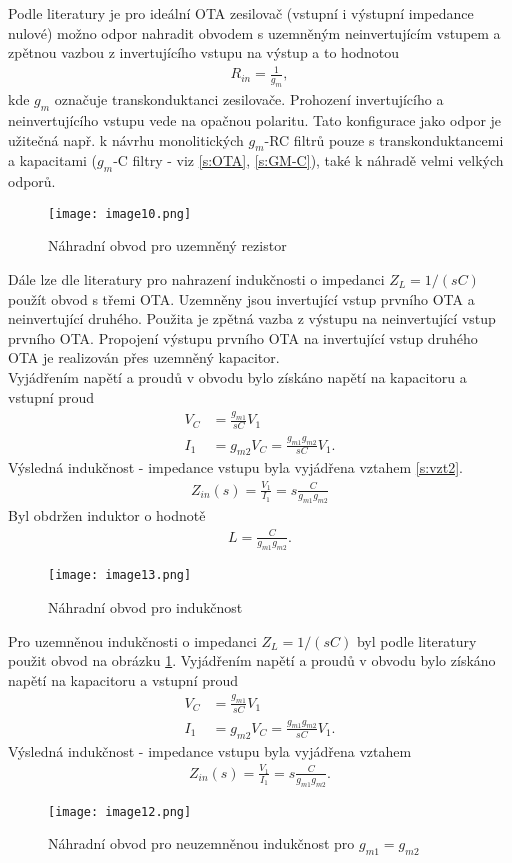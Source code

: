 \noindent Podle literatury \cite{16} je pro ideální OTA zesilovač (vstupní i výstupní impedance nulové) možno odpor nahradit obvodem s uzemněným neinvertujícím vstupem a zpětnou vazbou z invertujícího vstupu na výstup a to hodnotou
\begin{align}
R_{in} = \frac{1}{g_{m}},
\end{align}
kde $g_{m}$ označuje transkonduktanci zesilovače. Prohození invertujícího a neinvertujícího vstupu vede na opačnou polaritu. Tato konfigurace jako odpor je užitečná např. k návrhu monolitických $g_m$-RC filtrů pouze s transkonduktancemi a kapacitami ($g_m$-C filtry - viz \ref{s:OTA}, \ref{s:GM-C}), také k náhradě velmi velkých odporů.
\begin{figure}[h]
\centering
\texttt{[image: image10.png]}
\caption[Náhradní obvod pro uzemněný rezistor]{Náhradní obvod pro uzemněný rezistor \cite{16}}
\end{figure}
\noindent Dále lze dle literatury \cite{16} pro nahrazení indukčnosti o impedanci $Z_L = 1/(sC)$ použít obvod s třemi OTA. Uzemněny jsou invertující vstup prvního OTA a neinvertující druhého. Použita je zpětná vazba z výstupu na neinvertující vstup prvního OTA. Propojení výstupu prvního OTA na invertující vstup druhého OTA je realizován přes uzemněný kapacitor. \\
Vyjádřením napětí a proudů v obvodu bylo získáno napětí na kapacitoru a vstupní proud
\begin{align}\label{s:vzt2}
V_C &= \frac{g_{m1}}{sC}V_1 \\
I_1 &= g_{m2}V_C = \frac{g_{m1}g_{m2}}{sC}V_1.
\end{align}
Výsledná indukčnost - impedance vstupu byla vyjádřena vztahem \ref{s:vzt2}.
\begin{align}
Z_{in}(s) = \frac{V_1}{I_1} = s\frac{C}{g_{m1}g_{m2}}
\end{align}
\noindent Byl obdržen induktor o hodnotě
\begin{align}
L = \frac{C}{g_{m1}g_{m2}}.
\end{align}
\begin{figure}[h]
\centering
\texttt{[image: image13.png]}
\caption[Náhradní obvod pro indukčnost]{Náhradní obvod pro indukčnost \cite{16} \label{s:IND}}
\end{figure}
\noindent Pro uzemněnou indukčnosti o impedanci $Z_L = 1/(sC)$ byl podle literatury \cite{16} použit obvod na obrázku \ref{s:IND}. Vyjádřením napětí a proudů v obvodu bylo získáno napětí na kapacitoru a vstupní proud
\begin{align}
V_C &= \frac{g_{m1}}{sC}V_1 \\
I_1 &= g_{m2}V_C = \frac{g_{m1}g_{m2}}{sC}V_1.
\end{align}
Výsledná indukčnost - impedance vstupu byla vyjádřena vztahem
\begin{align}
Z_{in}(s) = \frac{V_1}{I_1} = s\frac{C}{g_{m1}g_{m2}}.
\end{align}
\begin{figure}[h]
\centering
\texttt{[image: image12.png]}
\caption[Náhradní obvod pro neuzemněnou indukčnost]{Náhradní obvod pro neuzemněnou indukčnost pro $g_{m1} = g_{m2}$\cite{16}}
\end{figure}
